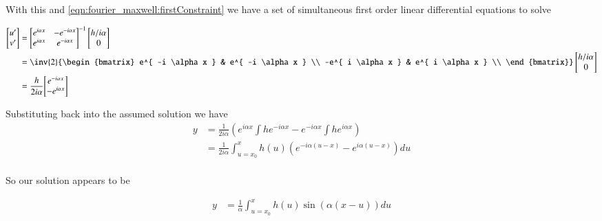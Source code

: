 With this and \ref{eqn:fourier_maxwell:firstConstraint} we have a set of simultaneous first order linear differential equations to solve

\begin{align*}
\begin{bmatrix}
u' \\
v' \\
\end{bmatrix}
&=
{\begin{bmatrix}
 e^{ i \alpha x } &- e^{ -i \alpha x } \\
 e^{ i \alpha x } &  e^{ -i \alpha x } \\
\end{bmatrix}}^{-1}
\begin{bmatrix}
{h}/{i \alpha} \\
0 \\
\end{bmatrix} \\
&=
\inv{2}
{\begin{bmatrix}
 e^{ -i \alpha x } & e^{ -i \alpha x } \\
 -e^{ i \alpha x } &  e^{ i \alpha x } \\
\end{bmatrix}}
\begin{bmatrix}
{h}/{i \alpha} \\
0 \\
\end{bmatrix} \\
&=
\frac{h}{2 i \alpha}
{\begin{bmatrix}
 e^{ -i \alpha x } \\
 -e^{ i \alpha x } \\
\end{bmatrix}}
\end{align*}

Substituting back into the assumed solution we have
\begin{align*}
y
&= \frac{1}{2 i \alpha} \left(
  e^{ i \alpha x } \int h e^{ -i \alpha x }
- e^{ -i \alpha x } \int h e^{ i \alpha x }
\right) \\
&= \frac{1}{2 i \alpha} \int_{u=x_0}^x h(u) \left( e^{ -i \alpha (u-x) } -e^{ i \alpha (u-x) } \right) du \\
\end{align*}

So our solution appears to be

\begin{align}\label{eqn:fourier_maxwell:solutionToWaveNumberDomainEquation}
y &= \frac{1}{\alpha} \int_{u=x_0}^x h(u) \sin( \alpha(x-u) ) du
\end{align}

